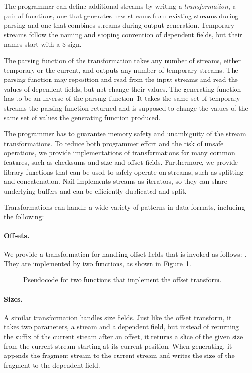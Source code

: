 The programmer can define additional streams by writing a \emph{transformation}, a pair of
functions, one that generates new streams from existing streams during parsing and one that
combines streams during output generation. Temporary streams follow the naming and
scoping convention of dependent fields, but their names start with a \$-sign. 


The parsing function of the transformation takes any number of streams, either temporary or the current,
and outputs any number of temporary streams. The parsing function may reposition and read from the
input streams and read the values of dependent fields, but not change their values. The generating
function has to be an inverse of the parsing function. It takes the same set of temporary streams
the parsing function returned and is supposed to change the values of the same set of values the
generating function produced.

The programmer has to guarantee memory safety and unambiguity of the stream transformations. To
reduce both programmer effort and the risk of unsafe operations, we provide implementations of
transformations for many common features, such as checksums and size and offset fields. Furthermore,
we provide library functions that can be used to safely operate on streams, such as splitting and
concatenation. Nail implements streams as iterators, so they can share underlying buffers and can be
efficiently duplicated and split.

Transformations can handle a wide variety of patterns in data formats, including the following: 
\paragraph{Offsets.}
We provide a transformation for handling offset fields that is invoked as follows:
. 
They are implemented by two functions, as shown in Figure~\ref{fig:xform-sig}.

\begin{figure}[h]
\smaller[0.5]

\caption{Pseudocode for two functions that implement the offset transform.}
\label{fig:xform-sig}
\end{figure}


\paragraph{Sizes.}
A similar transformation handles size fields. Just like the offset transform, it takes two parameters, a
stream and a dependent field, but instead of returning the suffix of the current stream after an
offset, it returns a slice of the given size from the current stream starting at its current
position. When generating, it appends the fragment stream to the current stream and writes the size
of the fragment to the dependent field.

